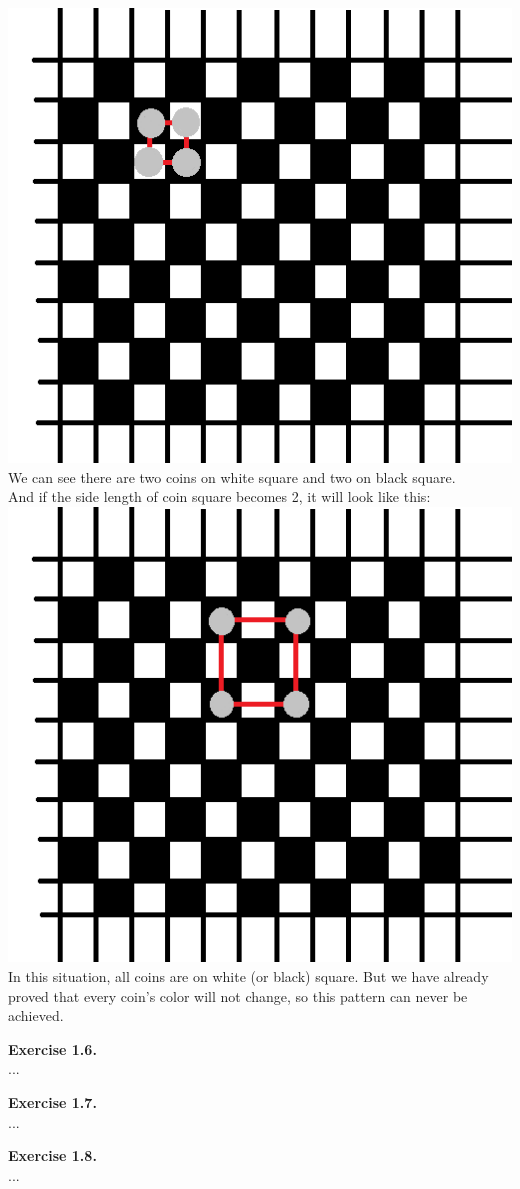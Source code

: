 \documentclass{article}
\begin{document}
\begin{flushleft}
\includegraphics[scale=0.8]{1_5_2.png}\\
We can see there are two coins on white square and two on black square.\\
And if the side length of coin square becomes 2, it will look like this:
\includegraphics[scale=0.8]{1_5_3.png}\\
In this situation, all coins are on white (or black) square. 
But we have already proved that every coin's color will not change, so this pattern can never be achieved.

\textbf{Exercise 1.6.} \\
...

\textbf{Exercise 1.7.} \\
...

\textbf{Exercise 1.8.} \\
...

\end{flushleft}
\end{document}
